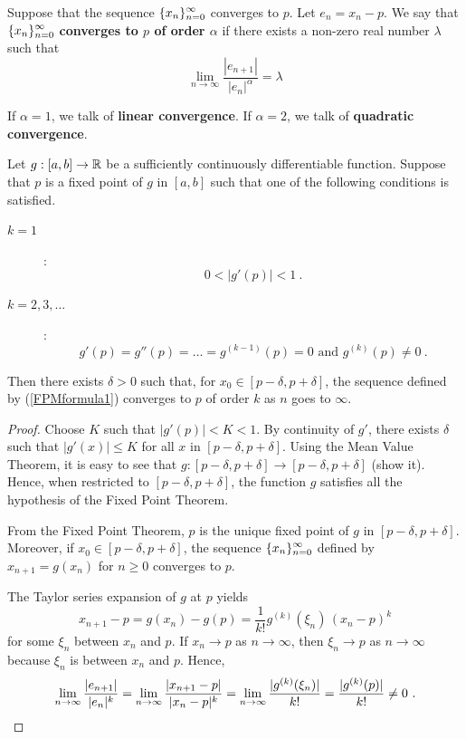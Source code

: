 \begin{defn}
Suppose that the sequence $\displaystyle \{x_n\}_{n=0}^\infty$ converges to $p$.
Let $e_n = x_n - p$.  We say that $\displaystyle \{x_n\}_{n=0}^\infty$
{\bfseries converges to $p$ of order $\alpha$} if there exists a non-zero real number $\lambda$
such that
\[
\lim_{n\rightarrow \infty}
\frac{|e_{n+1}|}{|e_n|^\alpha} = \lambda
\]
\end{defn}

If $\alpha = 1$, we talk of {\bfseries linear
convergence}.  If $\alpha = 2$,
we talk of {\bfseries quadratic convergence}.

\begin{theorem}
Let $g:[a,b] \rightarrow \mathbb{R}$ be a sufficiently continuously
differentiable function.  Suppose that $p$ is a fixed point of $g$ in
$[a,b]$ such that one of the following conditions is satisfied. 
\begin{description}
\item[$k=1$]:
\[
0 < |g'(p)| < 1 \ .
\]
\item[$k=2,3,\ldots$]:
\[
g'(p) = g''(p) = \ldots = g^{(k-1)}(p) = 0 \text{ and } g^{(k)}(p) \not=0 \ .
\]
\end{description}
Then there exists $\delta > 0$ such that, for
$x_0 \in [p-\delta, p + \delta]$, the sequence defined by
(\ref{FPMformula1}) converges to $p$ of order $k$ as $n$ goes to
$\infty$.
\label{FPorder}
\end{theorem}

\begin{proof}
Choose $K$ such that $|g'(p)| < K <1$.  By continuity of $g'$,
there exists $\delta$ such that $|g'(x)| \leq K$ for all $x$ in
$[p-\delta, p+\delta]$.  Using the Mean Value Theorem, it is easy to
see that $g:[p-\delta, p+\delta] \rightarrow [p-\delta, p+\delta]$
(show it).  Hence, when restricted to $[p-\delta, p + \delta]$, the
function $g$ satisfies all the hypothesis of the Fixed Point Theorem.

From the Fixed Point Theorem, $p$ is the unique fixed point of $g$ in
$[p-\delta, p + \delta]$.  Moreover, if
$x_0 \in [p-\delta, p + \delta]$, the sequence
$\displaystyle \{x_n\}_{n=0}^\infty$
defined by $x_{n+1} = g(x_n)$ for $n \geq 0$ converges to $p$.

The Taylor series expansion of $g$ at $p$ yields
\[
x_{n+1} - p = g(x_n) - g(p) = \frac{1}{k!} g^{(k)}(\xi_n)\,(x_n - p)^k
\]
for some $\xi_n$ between $x_n$ and $p$.  If $x_n \rightarrow p$ as
$n \rightarrow \infty$, then $\xi_n \rightarrow p$ as
$n \rightarrow \infty$ because $\xi_n$ is between $x_n$ and $p$.
Hence,
\[
\lim_{n\rightarrow \infty}\frac{|e_{n+1}|}{|e_n|^k}
= \lim_{n\rightarrow \infty}\frac{|x_{n+1}-p|}{|x_n-p|^k} \\
= \lim_{n\rightarrow \infty}\frac{|g^{(k)}(\xi_n)|}{k!}
= \frac{|g^{(k)}(p)|}{k!} \neq 0 \ .  \qedhere
\]
\end{proof}

